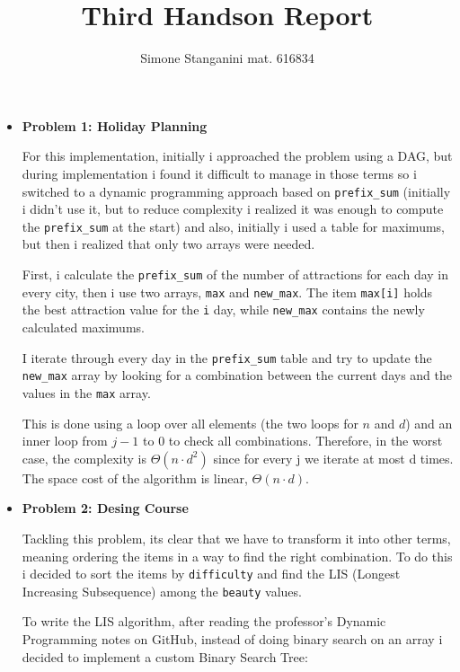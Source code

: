 \documentclass[10pt]{article}
\title{Third Handson Report}
\author{Simone Stanganini mat. 616834}
\begin{document}
\maketitle

\vspace{0.3cm}
\vspace{0.3cm}
\vspace{0.3cm}

\begin{itemize}
    \item \textbf{Problem 1: Holiday Planning}

        For this implementation, initially i approached the problem using a DAG, but during implementation i found it difficult to manage in those terms so i switched to a dynamic programming approach based on \texttt{prefix\_sum} (initially i didn't use it, but to reduce complexity i realized it was enough to compute the \texttt{prefix\_sum} at the start) and also, initially i used a table for maximums, but then i realized that only two arrays were needed.

        First, i calculate the \texttt{prefix\_sum} of the number of attractions for each day in every city, then i use two arrays, \texttt{max} and \texttt{new\_max}. The item \texttt{max[i]} holds the best attraction value for the \texttt{i} day, while \texttt{new\_max} contains the newly calculated maximums.

        I iterate through every day in the \texttt{prefix\_sum} table and try to update the \texttt{new\_max} array by looking for a combination between the current days and the values in the \texttt{max} array.

        This is done using a loop over all elements (the two loops for $n$ and $d$) and an inner loop from $j-1$ to $0$ to check all combinations. Therefore, in the worst case, the complexity is $\Theta(n\cdot d^2)$ since for every j we iterate at most d times. The space cost of the algorithm is linear, $\Theta(n\cdot d)$.

    \item \textbf{Problem 2: Desing Course}

        Tackling this problem, its clear that we have to transform it into other terms, meaning ordering the items in a way to find the right combination. To do this i decided to sort the items by \texttt{difficulty} and find the LIS (Longest Increasing Subsequence) among the \texttt{beauty} values.

        To write the LIS algorithm, after reading the professor's Dynamic Programming notes on GitHub, instead of doing binary search on an array i decided to implement a custom Binary Search Tree:


\end{itemize}
\end{document}
